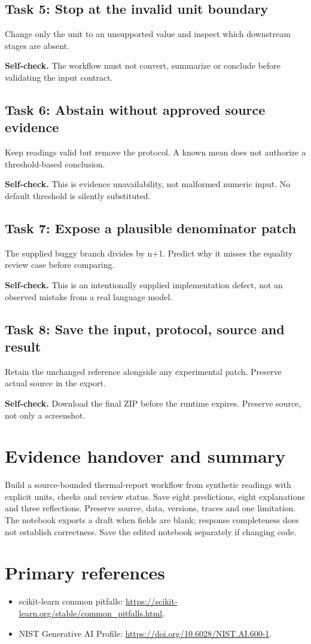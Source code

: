 \subsection{Task 5: Stop at the invalid unit boundary}
Change only the unit to an unsupported value and inspect which downstream stages are absent.

\textbf{Self-check.} The workflow must not convert, summarize or conclude before validating the input contract.
\subsection{Task 6: Abstain without approved source evidence}
Keep readings valid but remove the protocol. A known mean does not authorize a threshold-based conclusion.

\textbf{Self-check.} This is evidence unavailability, not malformed numeric input. No default threshold is silently substituted.
\subsection{Task 7: Expose a plausible denominator patch}
The supplied buggy branch divides by n+1. Predict why it misses the equality review case before comparing.

\textbf{Self-check.} This is an intentionally supplied implementation defect, not an observed mistake from a real language model.
\subsection{Task 8: Save the input, protocol, source and result}
Retain the unchanged reference alongside any experimental patch. Preserve actual source in the export.

\textbf{Self-check.} Download the final ZIP before the runtime expires. Preserve source, not only a screenshot.
\section{Evidence handover and summary}
Build a source-bounded thermal-report workflow from synthetic readings with explicit units, checks and review status. Save eight predictions, eight explanations and three reflections. Preserve source, data, versions, traces and one limitation. The notebook exports a draft when fields are blank; response completeness does not establish correctness. Save the edited notebook separately if changing code.
\section{Primary references}
\begin{itemize}
\item scikit-learn common pitfalls: \url{https://scikit-learn.org/stable/common_pitfalls.html}.
\item NIST Generative AI Profile: \url{https://doi.org/10.6028/NIST.AI.600-1}.
\end{itemize}
